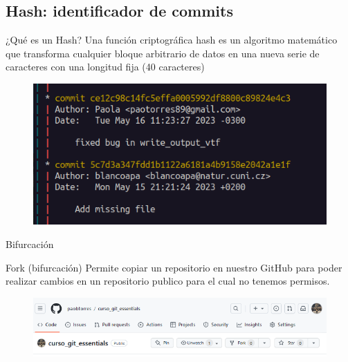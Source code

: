 \documentclass{beamer}
\begin{document}
\subsection{Hash: identificador de commits}

\begin{frame}

  \begin{alertblock}{¿Qué es un Hash?}
    Una función criptográfica hash es un algoritmo matemático que transforma cualquier bloque arbitrario de datos en una nueva serie de caracteres con una longitud fija (40 caracteres)
    \end{alertblock}  

\begin{figure}
  \includegraphics[width=\textwidth]{images/git-hash.png}
\end{figure}


\end{frame}


\begin{frame}{Bifurcación }

    \begin{block}{Fork (bifurcación)}
      Permite copiar un repositorio en nuestro GitHub para poder realizar cambios en un repositorio publico para el cual no tenemos permisos.
      \begin{figure}
        \includegraphics[width=\textwidth]{images/git-fork.PNG}
      \end{figure}
    \end{block}

  \end{frame}
\end{document}
